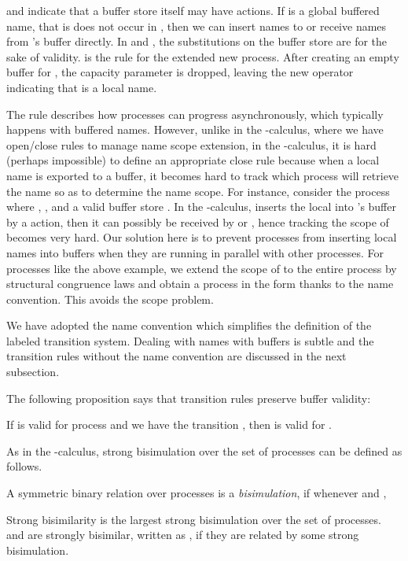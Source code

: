 \documentclass[runningheads, envcountsame, a4paper]{llncs}
\begin{document}
 and  indicate that a buffer store itself may have actions.
If  is a global buffered name, that is  does not occur in , then we can insert names to or receive names
from 's buffer directly.
In  and , the substitutions on the buffer store are for the sake of validity.
 is the rule for the extended new process. After creating an empty buffer for ,
the capacity parameter  is dropped, leaving the new operator indicating that  is a local name.

The  rule describes how processes can progress asynchronously, which typically happens with buffered names.
However, unlike in the -calculus, where we have open/close rules to manage name scope extension,
in the -calculus, it is hard (perhaps impossible) to define an appropriate close rule because when a local name
is exported to a buffer, it becomes hard to track which process will retrieve the name so as to determine the name scope.
For instance, consider the process  where , ,
 and a valid buffer store .
In the -calculus,  inserts the local  into 's buffer by a  action,
then it can possibly be received by  or , hence tracking the scope of  becomes very hard.
Our solution here is to prevent processes from inserting local names into buffers when they are running in parallel with other processes.
For processes like the above example, we extend the scope of  to the entire process by structural congruence laws
and obtain a process in the form  thanks to the name convention.
This avoids the scope problem.

We have adopted the name convention which simplifies the definition of the labeled transition system.
Dealing with names with buffers is subtle and the transition rules without the name convention are discussed in the next subsection.

The following proposition says that transition rules preserve buffer validity:
\begin{proposition}
If  is valid for process  and we have the transition , then  is valid for .
\end{proposition}

As in the -calculus, strong bisimulation over the set of  processes can be defined as follows.
\begin{definition}
  A symmetric binary relation  over  processes is a \emph{bisimulation}, if whenever  and ,
  
  Strong bisimilarity  is the largest strong bisimulation over the set of  processes.  and  are strongly bisimilar, written as , if they are related by some strong bisimulation.
\end{definition}
\end{document}
